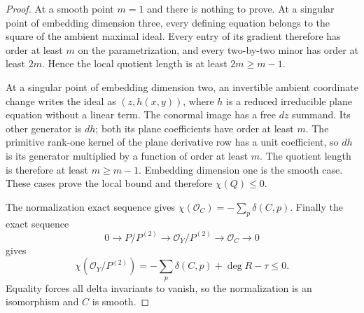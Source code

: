 \begin{proof}
At a smooth point $m=1$ and there is nothing to prove.
At a singular point of embedding dimension three, every defining
equation belongs to the square of the ambient maximal ideal.
Every entry of its gradient therefore has order at least $m$
on the parametrization, and every two-by-two minor has order
at least $2m$. Hence the local quotient length is at least
$2m\ge m-1$.

At a singular point of embedding dimension two, an invertible
ambient coordinate change writes the ideal as $(z,h(x,y))$,
where $h$ is a reduced irreducible plane equation without a
linear term. The conormal image has a free $dz$ summand.
Its other generator is $dh$; both its plane coefficients have
order at least $m$. The primitive rank-one kernel of the plane
derivative row has a unit coefficient, so $dh$ is its generator
multiplied by a function of order at least $m$. The quotient
length is therefore at least $m\ge m-1$. Embedding dimension
one is the smooth case. These cases prove the local bound and
therefore $\chi(Q)\le0$.

The normalization exact sequence gives
$\chi(\mathcal O_C)=-\sum_p\delta(C,p)$.
Finally the exact sequence
\[
 0\longrightarrow P/P^{(2)}\longrightarrow
 \mathcal O_Y/P^{(2)}\longrightarrow\mathcal O_C
 \longrightarrow0
\]
gives
\[
 \chi(\mathcal O_Y/P^{(2)})
 =-\sum_p\delta(C,p)+\deg R-\tau\le0.
\]
Equality forces all delta invariants to vanish, so the
normalization is an isomorphism and $C$ is smooth.
\end{proof}

